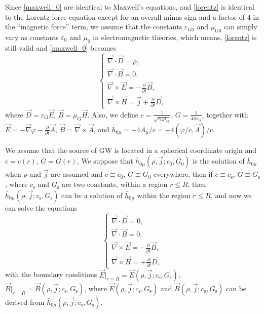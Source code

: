 \documentclass{article}
\def\p{\partial}
\begin{document}
Since \eqref{maxwell_0} are identical to Maxwell's equations, and \eqref{lorentz} is identical to the Lorentz force equation except for an overall minus sign and a factor of $4$ in the ``magnetic force'' term, we assume that the constants $\varepsilon_{\text{G}0}$ and $\mu_{\text{G}0}$ can simply vary as constants $\varepsilon_{0}$ and $\mu_{0}$ in electromagnetic theories, which means, \eqref{lorentz} is still valid and \eqref{maxwell_0} becomes
\begin{equation}\label{maxwell}
    \begin{cases}
        \vec{\nabla}\cdot\vec{D}=\rho,\\
        \vec{\nabla}\cdot\vec{B}=0,\\
        \vec{\nabla}\times\vec{E}=-\frac{\p}{\p t}\vec{B},\\
        \vec{\nabla}\times\vec{H}=\vec{j}+\frac{\p}{\p t}\vec{D},
    \end{cases}
\end{equation}
where $\vec{D}=\varepsilon_{\text{G}}\vec{E}$, $\vec{B}=\mu_{\text{G}}\vec{H}$. Also, we define $c=\frac{1}{\sqrt{\varepsilon_{\text{G}}\mu_{\text{G}}}}$, $G=\frac{1}{4\pi\varepsilon_{\text{G}}}$, together with $\vec{E}=-\vec{\nabla}\varphi-\frac{\p}{\p t}\vec{A}$, $\vec{B}=\vec{\nabla}\times\vec{A}$, and $\bar{h}_{0 \mu}=-4A_\mu/c=-4(\varphi/c,\vec{A})/c$.

We assume that the source of GW is located in a spherical coordinate origin and $c=c(r)$, $G=G(r)$, We suppose that $\bar{h}_{0 \mu}(\rho,\vec{j};c_0,G_0)$ is the solution of $\bar{h}_{0 \mu}$ when $\rho$ and $\vec{j}$ are assumed and $c\equiv c_0$, $G\equiv G_0$ everywhere, then if $c\equiv c_\text{s}$, $G\equiv G_\text{s}$, where $c_\text{s}$ and $G_\text{s}$ are two constants, within a region $r\leq R$, then $\bar{h}_{0 \mu}(\rho,\vec{j};c_\text{s},G_\text{s})$ can be a solution of $\bar{h}_{0 \mu}$ within the region $r\leq R$, and now we can solve the equations
\begin{equation}\label{maxwell_sf}
    \begin{cases}
        \vec{\nabla}\cdot\vec{D}=0,\\
        \vec{\nabla}\cdot\vec{B}=0,\\
        \vec{\nabla}\times\vec{E}=-\frac{\p}{\p t}\vec{B},\\
        \vec{\nabla}\times\vec{H}=+\frac{\p}{\p t}\vec{D},
    \end{cases}
\end{equation}
with the boundary conditions $\vec{E}|_{r=R}=\vec{E}(\rho,\vec{j};c_\text{s},G_\text{s})$, $\vec{B}|_{r=R}=\vec{B}(\rho,\vec{j};c_\text{s},G_\text{s})$, where $\vec{E}(\rho,\vec{j};c_\text{s},G_\text{s})$ and $\vec{B}(\rho,\vec{j};c_\text{s},G_\text{s})$ can be derived from $\bar{h}_{0 \mu}(\rho,\vec{j};c_\text{s},G_\text{s})$.
\end{document}
